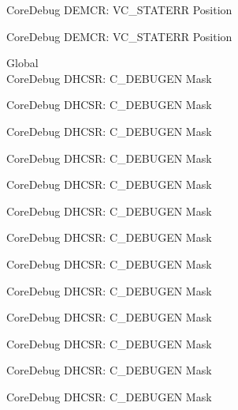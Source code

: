 \begin{DoxyRefList}
\label{deprecated__deprecated001190}%
%
Core\+Debug DEMCR\+: VC\+\_\+\+STATERR Position 

\label{deprecated__deprecated001292}%
%
Core\+Debug DEMCR\+: VC\+\_\+\+STATERR Position  
\item[Global \doxylink{group___c_m_s_i_s___core_debug_gab815c741a4fc2a61988cd2fb7594210b}{Core\+Debug\+\_\+\+DHCSR\+\_\+\+C\+\_\+\+DEBUGEN\+\_\+\+Msk} ]\hfill \\
\label{deprecated__deprecated000040}%
%
Core\+Debug DHCSR\+: C\+\_\+\+DEBUGEN Mask 

\label{deprecated__deprecated000128}%
%
Core\+Debug DHCSR\+: C\+\_\+\+DEBUGEN Mask 

\label{deprecated__deprecated000184}%
%
Core\+Debug DHCSR\+: C\+\_\+\+DEBUGEN Mask 

\label{deprecated__deprecated000267}%
%
Core\+Debug DHCSR\+: C\+\_\+\+DEBUGEN Mask 

\label{deprecated__deprecated000326}%
%
Core\+Debug DHCSR\+: C\+\_\+\+DEBUGEN Mask 

\label{deprecated__deprecated000402}%
%
Core\+Debug DHCSR\+: C\+\_\+\+DEBUGEN Mask 

\label{deprecated__deprecated000491}%
%
Core\+Debug DHCSR\+: C\+\_\+\+DEBUGEN Mask 

\label{deprecated__deprecated000593}%
%
Core\+Debug DHCSR\+: C\+\_\+\+DEBUGEN Mask 

\label{deprecated__deprecated000718}%
%
Core\+Debug DHCSR\+: C\+\_\+\+DEBUGEN Mask 

\label{deprecated__deprecated000806}%
%
Core\+Debug DHCSR\+: C\+\_\+\+DEBUGEN Mask 

\label{deprecated__deprecated000862}%
%
Core\+Debug DHCSR\+: C\+\_\+\+DEBUGEN Mask 

\label{deprecated__deprecated000945}%
%
Core\+Debug DHCSR\+: C\+\_\+\+DEBUGEN Mask 

\label{deprecated__deprecated001004}%
%
Core\+Debug DHCSR\+: C\+\_\+\+DEBUGEN Mask 


\end{DoxyRefList}
